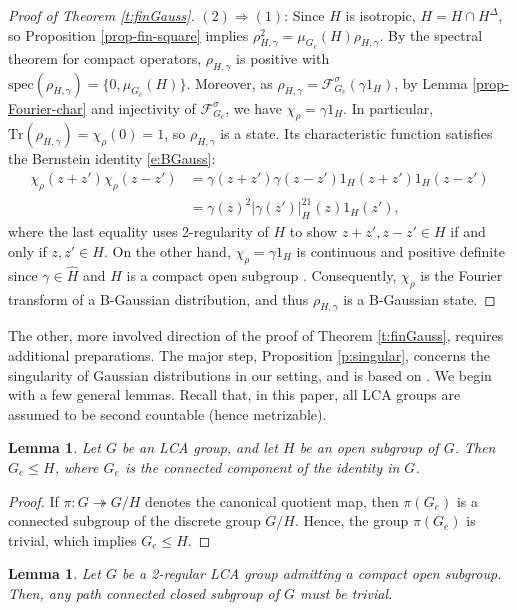 \documentclass[12pt,reqno]{amsart}
\newtheorem{lem}[thm]{Lemma}
\theoremstyle{definition}
\theoremstyle{definition}
\theoremstyle{definition}
\numberwithin{thm}{section}
\numberwithin{equation}{section}
\newcommand{\mc}[1]{\mathcal #1}
\begin{document}
\begin{proof}[Proof of Theorem \ref{t:finGauss}] $(2)\Rightarrow(1)$: Since $H$ is isotropic, $H=H\cap H^{\Delta}$, so Proposition \ref{prop-fin-square} implies $\rho_{H,\gamma}^2=\mu_{G_c}(H)\rho_{H,\gamma}$. By the spectral theorem for compact operators, 
$\rho_{H,\gamma}$ is positive with $\mathrm{spec}(\rho_{H,\gamma})=\{0,\mu_{G_c}(H)\}$. Moreover, as $\rho_{H,\gamma}=\mc{F}^\sigma_{G_c}(\gamma1_H)$, by Lemma \ref{prop-Fourier-char} and injectivity of $\mc{F}^\sigma_{G_c}$, we have $\chi_\rho=\gamma1_H$. In particular, $\mathrm{Tr}(\rho_{H,\gamma})=\chi_\rho(0)=1$, so $\rho_{H,\gamma}$ is a state. Its characteristic function satisfies the Bernstein identity \eqref{e:BGauss}: 
\begin{align*}\chi_\rho(z+z')\chi_\rho(z-z')&=\gamma(z+z')\gamma(z-z')1_H(z+z')1_H(z-z')\\
&=\gamma(z)^2|\gamma(z')|^21_H(z)1_H(z'),
\end{align*}
where the last equality uses 2-regularity of $H$ to show $z+z',z-z'\in H$ if and only if $z,z'\in H$. On the other hand, $\chi_{\rho}=\gamma 1_H$ is continuous and positive definite since $\gamma\in \widehat{H}$ and  $H$ is a compact open subgroup \cite{We40,Po40,Ra40}. Consequently, $\chi_{\rho}$ is the Fourier transform of a B-Gaussian distribution, and thus $\rho_{H,\gamma}$ is a B-Gaussian state.
\end{proof}

The other, more involved direction of the proof of  Theorem \ref{t:finGauss}, requires additional preparations. The major step, Proposition \ref{p:singular}, concerns the singularity of Gaussian distributions in our setting, and is based on \cite[Proposition 3.14]{Feldman}. We begin with a few general lemmas. Recall that, in this paper, all LCA groups are assumed to be second countable (hence metrizable).

\begin{lem}\label{lem-Ge} Let $G$ be an LCA group, and let $H$ be an open subgroup of $G$. Then $G_e\leq H$, where $G_e$ is the connected component of the identity in $G$.
\end{lem}

\begin{proof} If $\pi:G\twoheadrightarrow G/H$ denotes the canonical quotient map, then $\pi(G_e)$ is a connected subgroup of the discrete group $G/H$. Hence, the group $\pi(G_e)$ is trivial, which implies $G_e\leq H$.
\end{proof}

\begin{lem}\label{l:pathconn} Let $G$ be a 2-regular LCA group admitting a compact open subgroup. Then, any path connected closed subgroup of $G$ must be trivial.
\end{lem}
\end{document}
